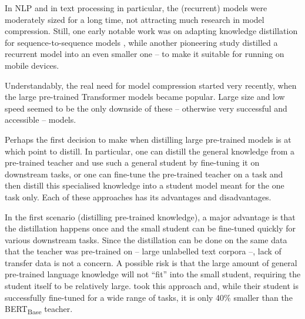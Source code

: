\documentclass[bsc,frontabs,singlespacing,parskip,deptreport]{infthesis}
\begin{document}
{{{      %
      In NLP and in text processing in particular, the (recurrent) models were moderately sized for a long time, not attracting much research in model compression. Still, one early notable work was on adapting knowledge distillation for sequence-to-sequence models \citep{Kim_2016}, while another pioneering study \citep{Yu_2018} distilled a recurrent model into an even smaller one -- to make it suitable for running on mobile devices.

      Understandably, the real need for model compression started very recently, when the large pre-trained Transformer models became popular. Large size and low speed seemed to be the only downside of these -- otherwise very successful and accessible -- models.

      Perhaps the first decision to make when distilling large pre-trained models is at which point to distill. In particular, one can distill the general knowledge from a pre-trained teacher and use such a general student by fine-tuning it on downstream tasks, or one can fine-tune the pre-trained teacher on a task and then distill this specialised knowledge into a student model meant for the one task only. Each of these approaches has its advantages and disadvantages.

      In the first scenario (distilling pre-trained knowledge), a major advantage is that the distillation happens once and the small student can be fine-tuned quickly for various downstream tasks.
      Since the distillation can be done on the same data that the teacher was pre-trained on -- large unlabelled text corpora --, lack of transfer data is not a concern.
      A possible risk is that the large amount of general pre-trained language knowledge will not ``fit'' into the small student, requiring the student itself to be relatively large. \citet{Sanh_2019} took this approach and, while their student is successfully fine-tuned for a wide range of tasks, it is only 40\% smaller than the BERT\textsubscript{Base} teacher.

}}}
\end{document}
